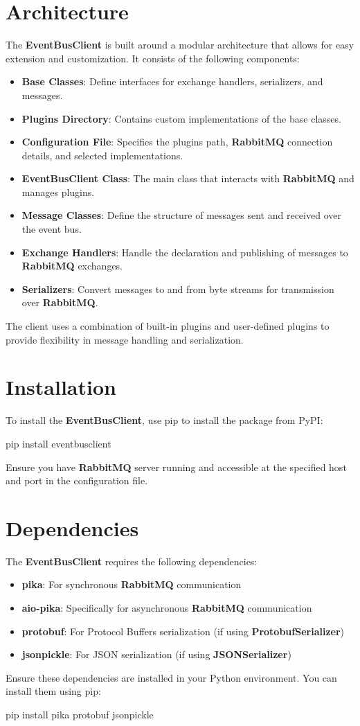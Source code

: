 \section{Architecture}\label{sec:architecture}
The \textbf{EventBusClient} is built around a modular architecture that allows for easy extension and customization. It consists of the following components:
\begin{itemize}
  \item \textbf{Base Classes}: Define interfaces for exchange handlers, serializers, and messages.
  \item \textbf{Plugins Directory}: Contains custom implementations of the base classes.
  \item \textbf{Configuration File}: Specifies the plugins path, \textbf{RabbitMQ} connection details, and selected implementations.
  \item \textbf{EventBusClient Class}: The main class that interacts with \textbf{RabbitMQ} and manages plugins.
  \item \textbf{Message Classes}: Define the structure of messages sent and received over the event bus.
  \item \textbf{Exchange Handlers}: Handle the declaration and publishing of messages to \textbf{RabbitMQ} exchanges.
  \item \textbf{Serializers}: Convert messages to and from byte streams for transmission over \textbf{RabbitMQ}.
\end{itemize}
The client uses a combination of built-in plugins and user-defined plugins to provide flexibility in message handling and serialization.
\section{Installation}\label{sec:installation}
To install the \textbf{EventBusClient}, use pip to install the package from PyPI:
\begin{pythonlog}
pip install eventbusclient
\end{pythonlog}
Ensure you have \textbf{RabbitMQ} server running and accessible at the specified host and port in the configuration file.
\section{Dependencies}\label{sec:dependencies}

The \textbf{EventBusClient} requires the following dependencies:
\begin{itemize}
  \item \textbf{pika}: For synchronous \textbf{RabbitMQ} communication
  \item \textbf{aio-pika}: Specifically for asynchronous \textbf{RabbitMQ} communication
  \item \textbf{protobuf}: For Protocol Buffers serialization (if using \textbf{ProtobufSerializer})
  \item \textbf{jsonpickle}: For JSON serialization (if using \textbf{JSONSerializer})
\end{itemize}
Ensure these dependencies are installed in your Python environment. You can install them using pip:
\begin{pythonlog}
pip install pika protobuf jsonpickle
\end{pythonlog}
